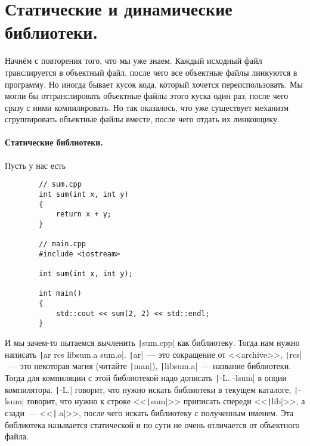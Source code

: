 \documentclass{article}
\begin{document}
    \section{Статические и динамические библиотеки.}
    Начнём с повторения того, что мы уже знаем. Каждый исходный файл транслируется в объектный файл, после чего все объектные файлы линкуются в программу. Но иногда бывает кусок кода, который хочется переиспользовать. Мы могли бы оттранслировать объектные файлы этого куска один раз, после чего сразу с ними компилировать. Но так оказалось, что уже существует механизм сгруппировать объектные файлы вместе, после чего отдать их линковщику.
    \paragraph{Статические библиотеки.}
    Пусть у нас есть
    \begin{verbatim}
        // sum.cpp
        int sum(int x, int y)
        {
            return x + y;
        }

        // main.cpp
        #include <iostream>

        int sum(int x, int y);

        int main()
        {
            std::cout << sum(2, 2) << std::endl;
        }
    \end{verbatim}
    И мы зачем-то пытаемся вычленить \texttt|sum.cpp| как библиотеку. Тогда нам нужно написать \texttt|ar rcs libsum.a sum.o|. \texttt|ar|~--- это сокращение от <<archive>>, \texttt|rcs|~--- это некоторая магия (читайте \texttt|man|), \texttt|libsum.a|~--- название библиотеки. Тогда для компиляции с этой библиотекой надо дописать \texttt|-L. -lsum| в опции компилятора. \texttt|-L.| говорит, что нужно искать библиотеки в текущем каталоге, \texttt|-lsum| говорит, что нужно к строке <<\texttt|sum|>> приписать спереди <<\texttt|lib|>>, а сзади~--- <<\texttt|.a|>>, после чего искать библиотеку с полученным именем. Эта библиотека называется статической и по сути не очень отличается от объектного файла.
\end{document}
